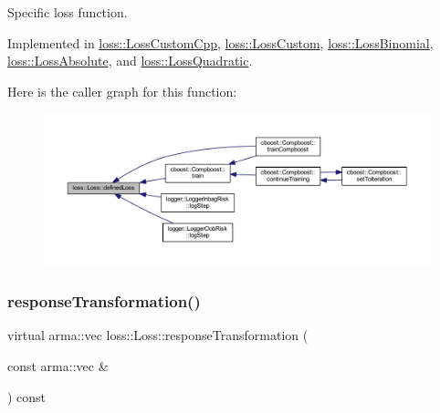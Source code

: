 Specific loss function. 



Implemented in \mbox{\hyperlink{classloss_1_1_loss_custom_cpp_abb0c51701c90ce115cd0a0440e5b28f8}{loss\+::\+Loss\+Custom\+Cpp}}, \mbox{\hyperlink{classloss_1_1_loss_custom_ad71351d35d7739651c487c2106571118}{loss\+::\+Loss\+Custom}}, \mbox{\hyperlink{classloss_1_1_loss_binomial_a396a06f762b735f83af21bdd4ba8fe9c}{loss\+::\+Loss\+Binomial}}, \mbox{\hyperlink{classloss_1_1_loss_absolute_af10b320d7253ef4f566530717441059e}{loss\+::\+Loss\+Absolute}}, and \mbox{\hyperlink{classloss_1_1_loss_quadratic_a7495a0d225ae5470840e8f377419d7cf}{loss\+::\+Loss\+Quadratic}}.

Here is the caller graph for this function\+:
\nopagebreak
\begin{figure}[H]
\begin{center}
\leavevmode
\includegraphics[width=350pt]{classloss_1_1_loss_ae9f94dd9b8311397583ba3a9cb485e94_icgraph}
\end{center}
\end{figure}
\mbox{\label{classloss_1_1_loss_a0a84b7df79b08e40b538aaa7e6ee75c4}} 
\subsubsection{\texorpdfstring{response\+Transformation()}{responseTransformation()}}
{\footnotesize\ttfamily virtual arma\+::vec loss\+::\+Loss\+::response\+Transformation (\begin{DoxyParamCaption}\item[{const arma\+::vec \&}]{ }\end{DoxyParamCaption}) const\hspace{0.3cm}{\ttfamily [pure virtual]}}



